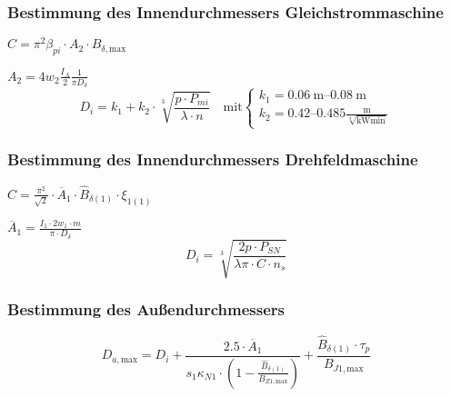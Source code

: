 \begin{sectionbox}
\subsubsection{Bestimmung des Innendurchmessers Gleichstrommaschine}
\begin{symbolbox}
	\begin{center}
		$C = \pi^2\beta_{pi}\cdot A_2\cdot B_{\delta,\text{max}}$
	\end{center}
\end{symbolbox}
$A_2 = 4w_2\frac{I_A}{2}\frac{1}{\pi D_\delta}$\\
\[D_i = k_1 + k_2\cdot\sqrt[3]{\frac{p\cdot P_{mi}}{\lambda\cdot n}}\quad\text{mit}\begin{cases}
k_1 = \SIrange{0.06}{0.08}{\meter}\\
k_2 = \numrange{0.42}{0.485}\frac{\si{\meter}}{\sqrt[3]{\si{\kilo\watt\minute}}}
\end{cases}\]

\subsubsection{Bestimmung des Innendurchmessers Drehfeldmaschine}
\begin{symbolbox}
	\begin{center}
		$C = \frac{\pi^2}{\sqrt{2}}\cdot\overline{A}_1\cdot \hat B_{\delta (1)}\cdot\xi_{1(1)}$
	\end{center}
\end{symbolbox}
$\overline A_1 = \frac{I_1\cdot 2w_1\cdot m}{\pi\cdot D_\delta}$\\
\[D_i = \sqrt[3]{\frac{2p\cdot P_{SN}}{\lambda\pi\cdot C\cdot n_s}}\]

\subsubsection{Bestimmung des Außendurchmessers}
\[D_{a,\text{max}} = D_i + \frac{\num{2.5}\cdot\overline{A}_1}{s_1\kappa_{N1}\cdot\left(1-\frac{\hat B_{\delta(1)}}{B_{Z1,\text{max}}}\right)} + \frac{\hat B_{\delta (1)}\cdot\tau_p}{B_{J1,\text{max}}}\]
\end{sectionbox}

